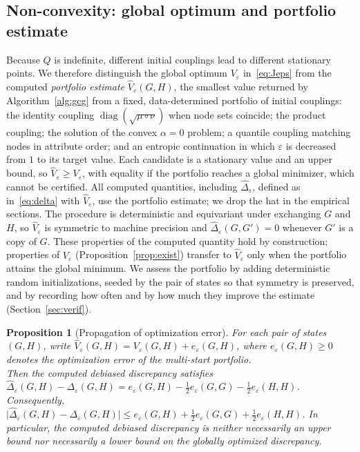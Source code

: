\documentclass[12pt]{article}
\newtheorem{proposition}{Proposition}
\theoremstyle{definition}
\begin{document}
\subsection{Non-convexity: global optimum and portfolio estimate}\label{sec:multistart}

Because $Q$ is indefinite, different initial couplings lead to different stationary points. We therefore distinguish the global optimum $V_\varepsilon$ in~\eqref{eq:Jeps} from the computed \emph{portfolio estimate} $\widehat V_\varepsilon(G,H)$, the smallest value returned by Algorithm~\ref{alg:gcg} from a fixed, data-determined portfolio of initial couplings: the identity coupling $\operatorname{diag}(\sqrt{\mu\circ\nu})$ when node sets coincide; the product coupling; the solution of the convex $\alpha=0$ problem; a quantile coupling matching nodes in attribute order; and an entropic continuation in which $\varepsilon$ is decreased from $1$ to its target value. Each candidate is a stationary value and an upper bound, so $\widehat V_\varepsilon\ge V_\varepsilon$, with equality if the portfolio reaches a global minimizer, which cannot be certified. All computed quantities, including $\widehat\Delta_\varepsilon$, defined as in~\eqref{eq:delta} with $\widehat V_\varepsilon$, use the portfolio estimate; we drop the hat in the empirical sections. The procedure is deterministic and equivariant under exchanging $G$ and $H$, so $\widehat V_\varepsilon$ is symmetric to machine precision and $\widehat\Delta_\varepsilon(G,G')=0$ whenever $G'$ is a copy of $G$. These properties of the computed quantity hold by construction; properties of $V_\varepsilon$ (Proposition~\ref{prop:exist}) transfer to $\widehat V_\varepsilon$ only when the portfolio attains the global minimum. We assess the portfolio by adding deterministic random initializations, seeded by the pair of states so that symmetry is preserved, and by recording how often and by how much they improve the estimate (Section~\ref{sec:verif}).
\begin{proposition}[Propagation of optimization error]
\label{prop:optimization-error}
For each pair of states $(G,H)$, write $\widehat V_\varepsilon(G,H)=V_\varepsilon(G,H)+e_\varepsilon(G,H)$, where $e_\varepsilon(G,H)\geq0$ denotes the optimization error of the multi-start portfolio.\\
Then the computed debiased discrepancy satisfies $\widehat\Delta_\varepsilon(G,H)-\Delta_\varepsilon(G,H)=e_\varepsilon(G,H)-\frac12e_\varepsilon(G,G)-\frac12e_\varepsilon(H,H)$. Consequently, $\bigl|\widehat\Delta_\varepsilon(G,H)-\Delta_\varepsilon(G,H)\bigr|\leq e_\varepsilon(G,H)+\frac12e_\varepsilon(G,G)+\frac12e_\varepsilon(H,H)$. In particular, the computed debiased discrepancy is neither necessarily an upper bound nor necessarily a lower bound on the globally optimized discrepancy.
\end{proposition}
\end{document}
